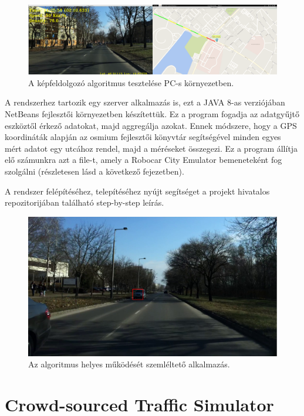 \documentclass[a4paper,12pt]{report}
\begin{document}
\begin{figure}[h]
\centerline{
\includegraphics[width=6in]{img/rttapc}}
\caption{A képfeldolgozó algoritmus tesztelése PC-s környezetben.}
\label{rttapc}
\end{figure}

A rendszerhez tartozik egy szerver alkalmazás is, ezt a JAVA 8-as verziójában NetBeans fejlesztői környezetben készítettük. Ez a program fogadja az adatgyűjtő eszköztől érkező adatokat, majd aggregálja azokat. Ennek módszere, hogy a GPS koordináták alapján az osmium fejlesztői könyvtár segítségével minden egyes mért adatot egy utcához rendel, majd a méréseket összegezi. Ez a program állítja elő számunkra azt a file-t, amely a Robocar City Emulator bemeneteként fog szolgálni (részletesen lásd a következő fejezetben). 

A rendszer felépítéséhez, telepítéséhez nyújt segítséget a projekt hivatalos repozitorijában \cite{rtta} található step-by-step leírás.

\begin{figure}[h]
\centerline{
\includegraphics[width=6in]{img/carredrect}}
\caption{Az algoritmus helyes működését szemléltető alkalmazás.}
\label{carredrect}
\end{figure}

\chapter{Crowd-sourced Traffic Simulator}
\label{cstschapter}
\end{document}

